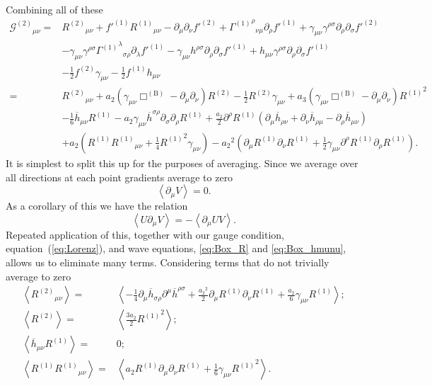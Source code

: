 \documentclass[a4paper, 11pt, titlepage, twoside]{report}
\newcommand{\eqnref}[1]{equation~(\ref{eq:#1})}
\newcommand{\recip}[1]{\ensuremath{\frac{1}{#1}}}
\begin{document}
Combining all of these
\begin{align}
{\mathcal{G}^{(2)}}_{\mu\nu} = {} & {R^{(2)}}_{\mu\nu} + f'^{(1)}{R^{(1)}}_{\mu\nu} - \partial_\mu\partial_\nu f'^{(2)} + {{\Gamma^{(1)}}^\rho}_{\nu\mu}\partial_\rho f'^{(1)} + \gamma_{\mu\nu}\gamma^{\rho\sigma}\partial_\rho\partial_\sigma f'^{(2)} \nonumber \\
 & - {} \gamma_{\mu\nu}\gamma^{\rho\sigma}{{\Gamma^{(1)}}^\lambda}_{\sigma\rho}\partial_\lambda f'^{(1)} - \gamma_{\mu\nu}h^{\rho\sigma}\partial_\rho\partial_\sigma f'^{(1)} + h_{\mu\nu}\gamma^{\rho\sigma}\partial_\rho\partial_\sigma f'^{(1)} \nonumber \\
 & - {} \recip{2}f^{(2)}\gamma_{\mu\nu} - \recip{2}f^{(1)}h_{\mu\nu} \nonumber \\
 = {} & {R^{(2)}}_{\mu\nu} + a_2\left(\gamma_{\mu\nu}\Box^{(\mathrm{B})} - \partial_\mu\partial_\nu\right)R^{(2)} - \recip{2}R^{(2)}\gamma_{\mu\nu} + a_3\left(\gamma_{\mu\nu}\Box^{(\mathrm{B})} - \partial_\mu\partial_\nu\right){R^{(1)}}^2 \nonumber \\
 & - {} \recip{6}\overline{h}_{\mu\nu}R^{(1)} - a_2\gamma_{\mu\nu}\overline{h}^{\sigma\rho}\partial_\sigma\partial_\rho R^{(1)} + \frac{a_2}{2} \partial^\rho R^{(1)} \left(\partial_\mu\overline{h}_{\rho\nu} + \partial_\nu\overline{h}_{\rho\mu} - \partial_\rho\overline{h}_{\mu\nu}\right) \nonumber \\
 & + {} a_2\left(R^{(1)}{R^{(1)}}_{\mu\nu} + \recip{4}{R^{(1)}}^2\gamma_{\mu\nu}\right) - {a_2}^2\left(\partial_\mu R^{(1)}\partial_\nu R^{(1)} + \recip{2} \gamma_{\mu\nu}\partial^\rho R^{(1)}\partial_\rho R^{(1)}\right).
\end{align}
It is simplest to split this up for the purposes of averaging. Since we average over all directions at each point gradients average to zero\cite{Hobson2006}
\begin{equation}
\left\langle\partial_\mu V\right\rangle = 0.
\end{equation}
As a corollary of this we have the relation
\begin{equation}
\left\langle U\partial_\mu V\right\rangle = -\left\langle \partial_\mu U V\right\rangle.
\end{equation}
Repeated application of this, together with our gauge condition, \eqnref{Lorenz}, and wave equations, \eqref{eq:Box_R} and \eqref{eq:Box_hmunu}, allows us to eliminate many terms. Considering terms that do not trivially average to zero
\begin{align}
\left\langle {R^{(2)}}_{\mu\nu} \right\rangle = {} & \left\langle -\recip{4} \partial_\mu\overline{h}_{\sigma\rho}\partial^\mu\overline{h}^{\rho\sigma} + \frac{{a_2}^2}{2}\partial_\mu R^{(1)}\partial_\nu R^{(1)} + \frac{a_2}{6}\gamma_{\mu\nu}R^{(1)} \right\rangle; \\
\left\langle R^{(2)} \right\rangle = {} & \left\langle \frac{3a_2}{2}{R^{(1)}}^2 \right\rangle; \\
\left\langle \overline{h}_{\mu\nu}R^{(1)} \right\rangle = {} & 0; \\
\left\langle R^{(1)}{R^{(1)}}_{\mu\nu} \right\rangle = {} & \left\langle a_2 R^{(1)} \partial_\mu\partial_\nu R^{(1)} + \recip{6}\gamma_{\mu\nu}{R^{(1)}}^2\right\rangle.
\end{align}
\end{document}
